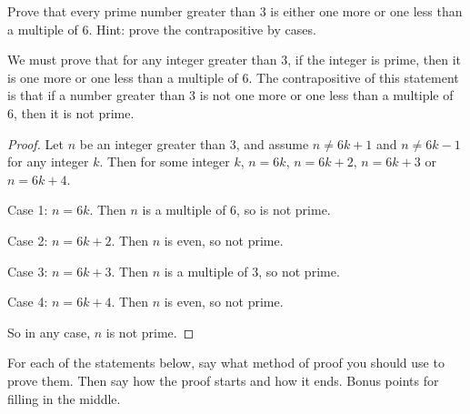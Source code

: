 \begin{questions}
\question Prove that every prime number greater than 3 is either one more or one less than a multiple of 6.  Hint: prove the contrapositive by cases.

	\begin{answer}
		We must prove that for any integer greater than 3, if the integer is prime, then it is one more or one less than a multiple of 6.  The contrapositive of this statement is that if a number greater than 3 is not one more or one less than a multiple of 6, then it is not prime.
		\begin{proof}
		      Let $n$ be an integer greater than 3, and assume $n \ne 6k+1$ and $n \ne 6k-1$ for any integer $k$.  Then for some integer $k$, $n = 6k$, $n = 6k+2$, $n = 6k+3$ or $n = 6k+4$.

		      Case 1: $n = 6k$.  Then $n$ is a multiple of 6, so is not prime.

		      Case 2: $n = 6k+2$.  Then $n$ is even, so not prime.

		      Case 3: $n = 6k+3$.  Then $n$ is a multiple of 3, so not prime.

		      Case 4: $n = 6k+4$.  Then $n$ is even, so not prime.

		      So in any case, $n$ is not prime.
		    \end{proof}
	\end{answer}



\question For each of the statements below, say what method of proof you should use to prove them.  Then say how the proof starts and how it ends.  Bonus points for filling in the middle.

	\begin{answer}
		\begin{parts}

\end{parts}
\end{answer}
\end{questions}
